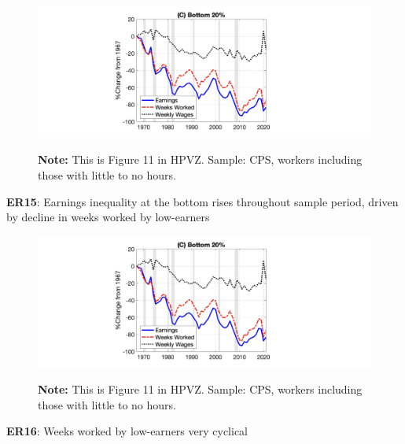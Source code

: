 \documentclass[11pt, aspectratio=169]{beamer}
\begin{document}
\begin{frame}{}
	\begin{figure}
		\includegraphics[scale=0.4]{./figures/inequality_earnings_5}
	\vspace*{-2mm}
	\begin{flushleft}
		{\scriptsize \hspace{6mm} \textbf{Note:} This is Figure 11 in HPVZ. Sample: CPS, workers including those with little to no hours.}
	\end{flushleft}	
	\end{figure}

	\vspace{-2mm}
	{\color{blue}\textbf{ER15}}: Earnings inequality at the bottom rises throughout sample period, driven by decline in weeks worked by low-earners 
\end{frame}


\begin{frame}{}
	\begin{figure}
		\includegraphics[scale=0.4]{./figures/inequality_earnings_5}
	\vspace*{-2mm}
	\begin{flushleft}
		{\scriptsize \hspace{6mm} \textbf{Note:} This is Figure 11 in HPVZ. Sample: CPS, workers including those with little to no hours.}
	\end{flushleft}	
	\end{figure}

	\vspace{0mm}
	{\color{blue}\textbf{ER16}}: Weeks worked by low-earners very cyclical
\end{frame}
\end{document}
